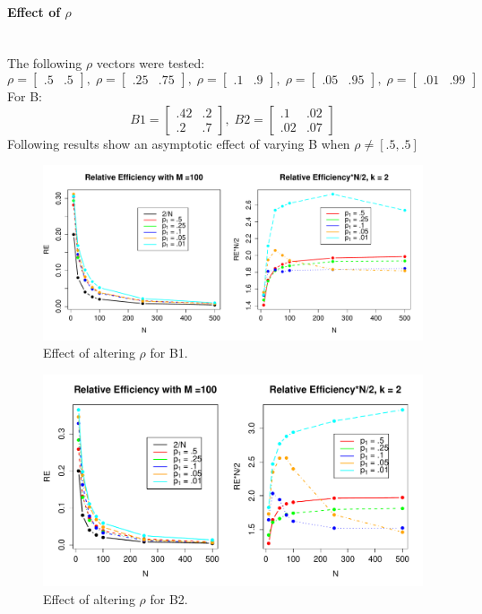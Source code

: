 \documentclass[10pt]{article}
\begin{document}
\paragraph{Effect of $\rho$}\mbox{}\\
The following $\rho$ vectors were tested:
\begin{equation*}
\rho = \begin{bmatrix}
.5 & .5
\end{bmatrix},\;
\rho = \begin{bmatrix}
.25 & .75
\end{bmatrix},\;
\rho = \begin{bmatrix}
.1 & .9
\end{bmatrix},\;
\rho = \begin{bmatrix}
.05 & .95
\end{bmatrix},\;
\rho = \begin{bmatrix}
.01 & .99
\end{bmatrix}
\end{equation*}
For B:
\begin{equation*}
B1 = \begin{bmatrix}
.42 & .2 \\
.2 & .7 
\end{bmatrix},\;
B2 = \begin{bmatrix}
.1 & .02 \\
.02 & .07 
\end{bmatrix}
\end{equation*}
Following results show an asymptotic effect of varying B when $\rho \ne [.5,.5]$
\begin{figure}[!htb]
	\centering
	\includegraphics[width=16.2cm]{RPlot09.pdf}
	\caption{Effect of altering $\rho$ for B1.}
	\label{fig:plot1}
\end{figure}
\begin{figure}[!htb]
	\centering
	\includegraphics[width=16.2cm]{RPlot10.pdf}
	\caption{Effect of altering $\rho$ for B2.}
	\label{fig:plot1}
\end{figure}
\newpage
\end{document}
